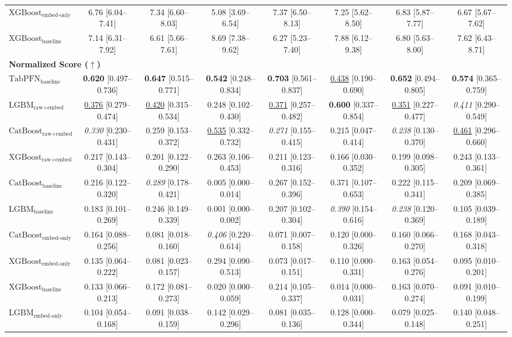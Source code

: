 \begin{table}[ht]
{\begin{tabular}{lccccccc}
$\text{XGBoost}_{\text{embed-only}}$ & 6.76 [6.04--7.41] & 7.34 [6.60--8.03] & 5.08 [3.69--6.54] & 7.37 [6.50--8.13] & 7.25 [5.62--8.50] & 6.83 [5.87--7.77] & 6.67 [5.67--7.62] \\
$\text{XGBoost}_{\text{baseline}}$ & 7.14 [6.31--7.92] & 6.61 [5.66--7.61] & 8.69 [7.38--9.62] & 6.27 [5.23--7.40] & 7.88 [6.12--9.38] & 6.80 [5.63--8.00] & 7.62 [6.43--8.71] \\
\midrule
\multicolumn{8}{l}{\textbf{Normalized Score ($\uparrow$)}} \\
\midrule
$\text{TabPFN}_{\text{baseline}}$ & \textbf{0.620} [0.497--0.736] & \textbf{0.647} [0.515--0.771] & \textbf{0.542} [0.248--0.834] & \textbf{0.703} [0.561--0.837] & \underline{0.438} [0.190--0.690] & \textbf{0.652} [0.494--0.805] & \textbf{0.574} [0.365--0.759] \\
$\text{LGBM}_{\text{raw+embed}}$ & \underline{0.376} [0.279--0.474] & \underline{0.420} [0.315--0.534] & 0.248 [0.102--0.430] & \underline{0.371} [0.257--0.482] & \textbf{0.600} [0.337--0.854] & \underline{0.351} [0.227--0.477] & \textit{0.411} [0.290--0.549] \\
$\text{CatBoost}_{\text{raw+embed}}$ & \textit{0.330} [0.230--0.431] & 0.259 [0.153--0.372] & \underline{0.535} [0.332--0.732] & \textit{0.271} [0.155--0.415] & 0.215 [0.047--0.414] & \textit{0.238} [0.130--0.370] & \underline{0.461} [0.296--0.660] \\
$\text{XGBoost}_{\text{raw+embed}}$ & 0.217 [0.143--0.304] & 0.201 [0.122--0.290] & 0.263 [0.106--0.453] & 0.211 [0.123--0.316] & 0.166 [0.030--0.352] & 0.199 [0.098--0.305] & 0.243 [0.133--0.361] \\
$\text{CatBoost}_{\text{baseline}}$ & 0.216 [0.122--0.320] & \textit{0.289} [0.178--0.421] & 0.005 [0.000--0.014] & 0.267 [0.152--0.396] & 0.371 [0.107--0.653] & 0.222 [0.115--0.341] & 0.209 [0.069--0.385] \\
$\text{LGBM}_{\text{baseline}}$ & 0.183 [0.101--0.269] & 0.246 [0.149--0.339] & 0.001 [0.000--0.002] & 0.207 [0.102--0.304] & \textit{0.390} [0.154--0.616] & \textit{0.238} [0.120--0.369] & 0.105 [0.039--0.189] \\
$\text{CatBoost}_{\text{embed-only}}$ & 0.164 [0.088--0.256] & 0.081 [0.018--0.160] & \textit{0.406} [0.220--0.614] & 0.071 [0.007--0.158] & 0.120 [0.000--0.326] & 0.160 [0.066--0.270] & 0.168 [0.043--0.318] \\
$\text{XGBoost}_{\text{embed-only}}$ & 0.135 [0.064--0.222] & 0.081 [0.023--0.157] & 0.294 [0.090--0.513] & 0.073 [0.017--0.151] & 0.110 [0.000--0.331] & 0.163 [0.054--0.276] & 0.095 [0.010--0.201] \\
$\text{XGBoost}_{\text{baseline}}$ & 0.133 [0.066--0.213] & 0.172 [0.081--0.273] & 0.020 [0.000--0.059] & 0.214 [0.105--0.337] & 0.014 [0.000--0.031] & 0.163 [0.070--0.274] & 0.091 [0.010--0.199] \\
$\text{LGBM}_{\text{embed-only}}$ & 0.104 [0.054--0.168] & 0.091 [0.038--0.159] & 0.142 [0.029--0.296] & 0.081 [0.035--0.136] & 0.128 [0.000--0.344] & 0.079 [0.025--0.148] & 0.140 [0.048--0.251] \\
\bottomrule
\end{tabular}%
}
\end{table}